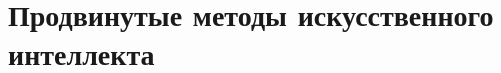 \documentclass[../../book-ru.tex]{subfiles}
\begin{document}
\chapter{Продвинутые методы искусственного интеллекта}
\label{ch:2.5-advanced-ai-ru}












\end{document}
